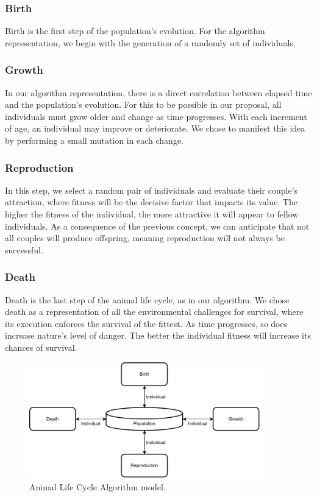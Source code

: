 \documentclass[graybox]{svmult}
\begin{document}
        \subsubsection{Birth} Birth is the first step of the population's
        evolution. For the algorithm representation, we begin with the
        generation of a randomly set of individuals.
        
        \subsubsection{Growth} In our algorithm representation, there is a
        direct correlation between elapsed time and the population's evolution.
        For this to be possible in our proposal, all individuals must grow
        older and change as time progresses. With each increment of age, an
        individual may improve or deteriorate. We chose to manifest this idea
        by performing a small mutation in each change.

        \subsubsection{Reproduction} In this step, we select a random pair of
        individuals and evaluate their couple's attraction, where fitness will
        be the decisive factor that impacts its value. The higher the fitness
        of the individual, the more attractive it will appear to fellow
        individuals. As a consequence of the previous concept, we can
        anticipate that not all couples will produce offspring, meaning
        reproduction will not always be successful.
        
        \subsubsection{Death} Death is the last step of the animal life cycle,
        as in our algorithm. We chose death as a representation of all the
        environmental challenges for survival, where its execution enforces the
        survival of the fittest. As time progresses, so does increase nature's
        level of danger. The better the individual fitness will increase its
        chances of survival.
        
        \begin{figure}
            \centering
            \includegraphics[width=100mm]{img/fig_algorithm_model.pdf}
            \caption{Animal Life Cycle Algorithm model.} \label{fig.algorithm_model}
            \end{figure}
\end{document}
